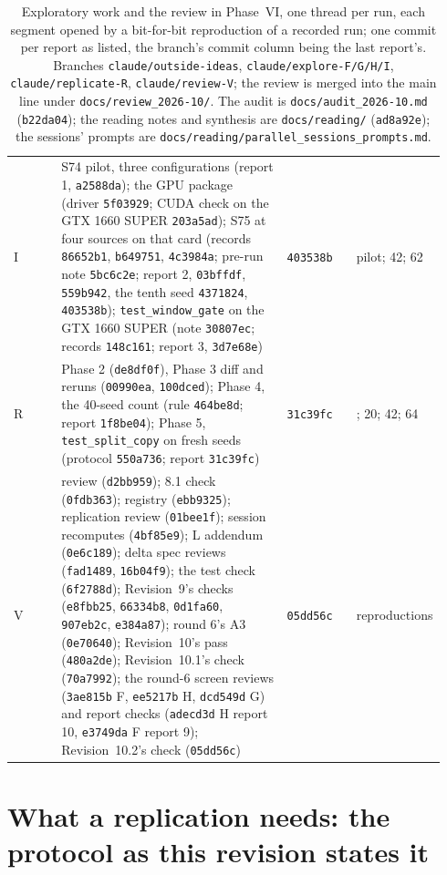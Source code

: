 \documentclass[11pt]{article}
\begin{document}
\begin{table}[H]
\begin{tabular}{@{}>{\raggedright\arraybackslash}p{0.11\linewidth}>{\raggedright\arraybackslash}p{0.52\linewidth}>{\raggedright\arraybackslash}p{0.16\linewidth}>{\raggedright\arraybackslash}p{0.15\linewidth}@{}}
I & S74 pilot, three configurations (report 1, \texttt{a2588da}); the GPU package (driver \texttt{5f03929}; CUDA check on the GTX 1660 SUPER \texttt{203a5ad}); S75 at four sources on that card (records \texttt{86652b1}, \texttt{b649751}, \texttt{4c3984a}; pre-run note \texttt{5bc6c2e}; report 2, \texttt{03bffdf}, \texttt{559b942}, the tenth seed \texttt{4371824}, \texttt{403538b}); \texttt{test\_window\_gate} on the GTX 1660 SUPER (note \texttt{30807ec}; records \texttt{148c161}; report 3, \texttt{3d7e68e}) & \texttt{403538b} & pilot; 42; 62\\
R & Phase 2 (\texttt{de8df0f}), Phase 3 diff and reruns (\texttt{00990ea}, \texttt{100dced}); Phase 4, the 40-seed count (rule \texttt{464be8d}; report \texttt{1f8be04}); Phase 5, \texttt{test\_split\_copy} on fresh seeds (protocol \texttt{550a736}; report \texttt{31c39fc}) & \texttt{31c39fc} & 42; 20; 42; 64\\
V & review (\texttt{d2bb959}); 8.1 check (\texttt{0fdb363}); registry (\texttt{ebb9325}); replication review (\texttt{01bee1f}); session recomputes (\texttt{4bf85e9}); L addendum (\texttt{0e6c189}); delta spec reviews (\texttt{fad1489}, \texttt{16b04f9}); the test check (\texttt{6f2788d}); Revision~9's checks (\texttt{e8fbb25}, \texttt{66334b8}, \texttt{0d1fa60}, \texttt{907eb2c}, \texttt{e384a87}); round 6's A3 (\texttt{0e70640}); Revision~10's pass (\texttt{480a2de}); Revision~10.1's check (\texttt{70a7992}); the round-6 screen reviews (\texttt{3ae815b} F, \texttt{ee5217b} H, \texttt{dcd549d} G) and report checks (\texttt{adecd3d} H report 10, \texttt{e3749da} F report 9); Revision~10.2's check (\texttt{05dd56c}) & \texttt{05dd56c} & 2 reproductions\\
\bottomrule
\end{tabular}
\caption{Exploratory work and the review in Phase~VI, one thread per run, each segment opened by a bit-for-bit reproduction of a recorded run; one commit per report as listed, the branch's commit column being the last report's. Branches \texttt{claude/outside-ideas}, \texttt{claude/explore-F/G/H/I}, \texttt{claude/replicate-R}, \texttt{claude/review-V}; the review is merged into the main line under \texttt{docs/review\_2026-10/}. The audit is \texttt{docs/audit\_2026-10.md} (\texttt{b22da04}); the reading notes and synthesis are \texttt{docs/reading/} (\texttt{ad8a92e}); the sessions' prompts are \texttt{docs/reading/parallel\_sessions\_prompts.md}.}
\label{tab:batches}
\end{table}

\section{What a replication needs: the protocol as this revision states it}
\label{app:repro}
\end{document}
